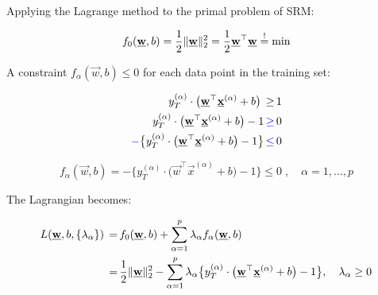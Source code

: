 \begin{frame}
Applying the Lagrange method to the primal problem of SRM:

\begin{equation}
f_{0}(\vec w,b) = \frac{1}{2} \lVert \vec w \rVert_{2}^{2} = \frac{1}{2} \vec w^{\top} \vec w \eqexcl \min
\end{equation}

A constraint $f_\alpha(\vec w,b) \le 0$ for each data point in the training set:

\pause

\slidesonly{\vspace{-3mm}}

\begin{align}
 y_{T}^{(\alpha)} \cdot \big( \vec w^{\top} \vec x^{(\alpha)} + b \big) \,\ge\, &1\\
 y_{T}^{(\alpha)} \cdot \big( \vec w^{\top} \vec x^{(\alpha)} + b \big) -1 \,{\color{blue}\ge}\, &0\\
 {\color{blue}-}\big\{y_{T}^{(\alpha)} \cdot \big( \vec w^{\top} \vec x^{(\alpha)} + b \big) -1\big\} \,{\color{blue}\le}\, &0
\end{align}

\begin{equation}
f_{\alpha} (\vec w,b) = -\big\{ y_{T}^{(\alpha)} \cdot \big( \vec w^{\top} \vec x^{(\alpha)} + b \big) -1 \big\} \le 0\;,\quad \alpha = 1,\ldots,p    
\end{equation}

The Lagrangian becomes:

\pause

\slidesonly{\vspace{-5mm}}

\begin{align}
L(\vec w, b, \{\lambda_{\alpha}\}) 
\,=&\, f_{0}(\vec w,b) + \sum_{\alpha=1}^{p} \lambda_{\alpha} f_{\alpha}(\vec w,b)\\
\,=&\, \frac{1}{2} \lVert \vec w \rVert_{2}^{2}
- \sum_{\alpha=1}^{p} \lambda_{\alpha} \big\{ y_{T}^{(\alpha)} \cdot \big( \vec w^{\top} \vec x^{(\alpha)} + b \big) -1 \big\}
\label{eq:lagrangianprimal}\slidesonly{,\quad \lambda_{\alpha} \ge 0}
\end{align}

\end{frame}

